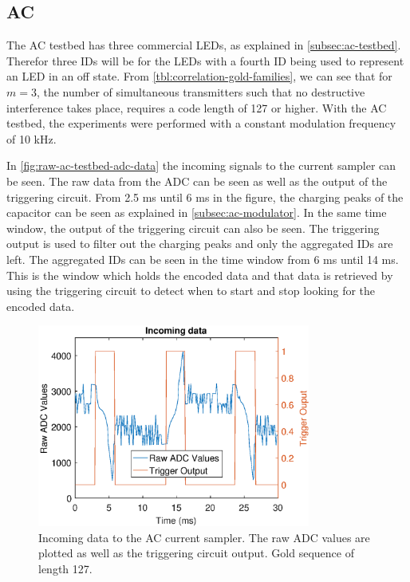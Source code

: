 
\subsection{AC}
\label{subsec:ac-evaluation}


The AC testbed has three commercial LEDs, as explained in \autoref{subsec:ac-testbed}.
Therefor three IDs will be for the LEDs with a fourth ID being used to represent an LED in an off state.
From \autoref{tbl:correlation-gold-families}, we can see that for $m = 3$, the number of simultaneous transmitters such that no destructive interference takes place, requires a code length of 127 or higher.
With the AC testbed, the experiments were performed with a constant modulation frequency of 10 kHz.


In \autoref{fig:raw-ac-testbed-adc-data} the incoming signals to the current sampler can be seen.
The raw data from the ADC can be seen as well as the output of the triggering circuit.
From 2.5 ms until 6 ms in the figure, the charging peaks of the capacitor can be seen as explained in \autoref{subsec:ac-modulator}.
In the same time window, the output of the triggering circuit can also be seen.
The triggering output is used to filter out the charging peaks and only the aggregated IDs are left.
The aggregated IDs can be seen in the time window from 6 ms until 14 ms.
This is the window which holds the encoded data and that data is retrieved by using the triggering circuit to detect when to start and stop looking for the encoded data.

\begin{figure}[ht]
  \centering
  \includegraphics[width=0.8\textwidth]{chapters/evaluation-chapters/hardware/ac/raw-ac-testbed-adc-data.eps}
  \caption{Incoming data to the AC current sampler. The raw ADC values are plotted as well as the triggering circuit output. Gold sequence of length 127.}
  \label{fig:raw-ac-testbed-adc-data}
\end{figure}


